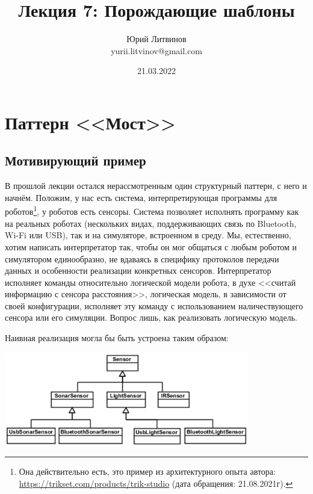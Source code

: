 \documentclass[a5paper]{article}
\title{Лекция 7: Порождающие шаблоны}
\author{Юрий Литвинов\\\small{yurii.litvinov@gmail.com}}
\date{21.03.2022}
\begin{document}
\maketitle
\thispagestyle{empty}

\section{Паттерн <<Мост>>}

\subsection{Мотивирующий пример}

В прошлой лекции остался нерассмотренным один структурный паттерн, с него и начнём. Положим, у нас есть система, интерпретирующая программы для роботов\footnote{Она действительно есть, это пример из архитектурного опыта автора: \url{https://trikset.com/products/trik-studio} (дата обращения: 21.08.2021г).}, у роботов есть сенсоры. Система позволяет исполнять программу как на реальных роботах (нескольких видах, поддерживающих связь по Bluetooth, Wi-Fi или USB), так и на симуляторе, встроенном в среду. Мы, естественно, хотим написать интерпретатор так, чтобы он мог общаться с любым роботом и симулятором единообразно, не вдаваясь в специфику протоколов передачи данных и особенности реализации конкретных сенсоров. Интерпретатор исполняет команды относительно логической модели робота, в духе <<считай информацию с сенсора расстояния>>, логическая модель, в зависимости от своей конфигурации, исполняет эту команду с использованием наличествующего сенсора или его симуляции. Вопрос лишь, как реализовать логическую модель.

Наивная реализация могла бы быть устроена таким образом:

\begin{center}
    \includegraphics[width=0.8\textwidth]{noBridge.png}
\end{center}
\end{document}
